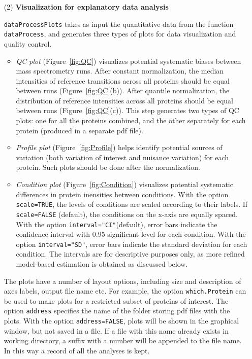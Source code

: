 \documentclass[11pt]{article}
\def\figref#1{Figure~\ref{fig:#1}}
\begin{document}
\begin{enumerate}
\item[(2)]{\bf Visualization for explanatory data analysis}


{\tt dataProcessPlots} takes as input the quantitative data from the function {\tt dataProcess}, and generates three types of plots for data visualization and quality control.

\begin{itemize}
\item {\it QC plot}  (\figref{QC}) visualizes potential systematic biases between mass spectrometry runs. After constant normalization, the median intensities of reference transitions across all proteins should be equal between runs (\figref{QC}(b)). After quantile normalization, the distribution of reference intensities across all proteins should be equal between runs (\figref{QC}(c)). This step generates two types of QC plots: one for all the proteins combined, and the other separately for each protein (produced in a separate pdf file).

\item {\it Profile plot} (\figref{Profile}) helps identify potential sources of variation (both variation of interest and nuisance variation) for each protein. Such plots should be done after the normalization.

\item {\it Condition plot} (\figref{Condition}) visualizes potential systematic differences in protein inensities  between conditions. With the option {\tt scale=TRUE}, the levels of conditions are scaled according to their labels. If {\tt scale=FALSE} (default), the conditions on the x-axis are equally spaced. With the option {\tt interval="CI"}(default), error bars indicate the confidence interval with 0.95 significant level for each condition. With the option {\tt interval="SD"}, error bars indicate the standard deviation for each condition. The intervals are for descriptive purposes only, as more refined model-based estimation is obtained as discussed below.
\end{itemize}

The plots have a number of layout options, including size and description of axes labels, output file name etc. For example, the option {\tt which.Protein} can be used to make plots for a restricted subset of proteins of interest. The option {\tt address} specifies the name of the folder storing pdf files with the plots. With the option {\tt address=FALSE}, plots will be shown in the graphical window, but not saved in a file. If a file with this name already exists in working directory, a suffix with a number will be appended to the file name. In this way a record of all the analyses is kept.


\end{enumerate}
\end{document}
